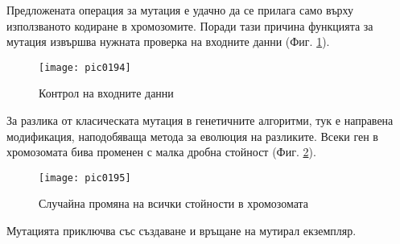 Предложената операция за мутация е удачно да се прилага само върху използваното кодиране в хромозомите. Поради тази причина функцията за мутация извършва нужната проверка на входните данни (Фиг. \ref{fig:pic0194}).

\begin{figure}[h]
  \centering
  \texttt{[image: pic0194]}
  \caption{Контрол на входните данни}
\label{fig:pic0194}
\end{figure}
\FloatBarrier

За разлика от класическата мутация в генетичните алгоритми, тук е направена модификация, наподобяваща метода за еволюция на разликите. Всеки ген в хромозомата бива променен с малка дробна стойност (Фиг. \ref{fig:pic0195}). 

\begin{figure}[h]
  \centering
  \texttt{[image: pic0195]}
  \caption{Случайна промяна на всички стойности в хромозомата}
\label{fig:pic0195}
\end{figure}
\FloatBarrier

Мутацията приключва със създаване и връщане на мутирал екземпляр.
